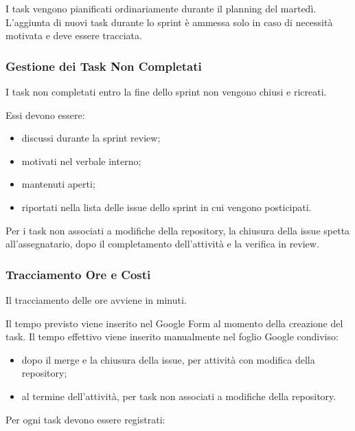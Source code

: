 I task vengono pianificati ordinariamente durante il planning del martedì.
L'aggiunta di nuovi task durante lo sprint è ammessa solo in caso di necessità
motivata e deve essere tracciata.


\subsubsection{Gestione dei Task Non Completati}

I task non completati entro la fine dello sprint non vengono chiusi e ricreati.

Essi devono essere:

\begin{itemize}
    \item discussi durante la sprint review;
    \item motivati nel verbale interno;
    \item mantenuti aperti;
    \item riportati nella lista delle issue dello sprint in cui vengono posticipati.
\end{itemize}

Per i task non associati a modifiche della repository, la chiusura della issue
spetta all'assegnatario, dopo il completamento dell'attività e la verifica in
review.


\subsubsection{Tracciamento Ore e Costi}
\label{sec:calcolo-ore}

Il tracciamento delle ore avviene in minuti.

Il tempo previsto viene inserito nel Google Form al momento della creazione del
task. Il tempo effettivo viene inserito manualmente nel foglio Google condiviso:

\begin{itemize}
    \item dopo il merge e la chiusura della issue, per attività con modifica della
    repository;
    \item al termine dell'attività, per task non associati a modifiche della repository.
\end{itemize}

Per ogni task devono essere registrati:


